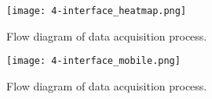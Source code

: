 \begin{figure}[h]
  \begin{center}
    \texttt{[image: 4-interface\_heatmap.png]}
  \end{center}
  \caption{Flow diagram of data acquisition process.}
  \label{fig:interface_heatmap}
\end{figure}

\begin{figure}[h]
  \begin{center}
    \texttt{[image: 4-interface\_mobile.png]}
  \end{center}
  \caption{Flow diagram of data acquisition process.}
  \label{fig:interface_mobile}
\end{figure}